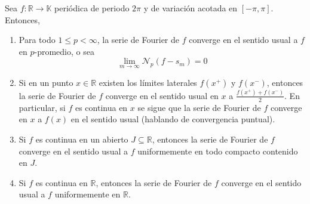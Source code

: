 \documentclass[12pt]{report}
\newcounter{it}
\theoremstyle{largebreak}
\renewcommand{\leq}{\ensuremath{\leqslant}}
\newcommand\cf[3]{\ensuremath{#1:#2\rightarrow#3}}
\newcommand{\N}[2]{\ensuremath{\mathcal{N}_{#1}\left(#2\right)}}
\begin{document}
    \begin{theor}
        Sea $\cf{f}{\mathbb{R}}{\mathbb{K}}$ periódica de periodo $2\pi$ y de variación acotada en $[-\pi,\pi]$. Entonces,
        \begin{enumerate}
            \item Para todo $1\leq p<\infty$, la serie de Fourier de $f$ converge en el sentido usual a $f$ en $p$-promedio, o sea
            \begin{equation*}
                \lim_{ m\rightarrow\infty}\N{p}{f-s_m}=0
            \end{equation*}
            \item Si en un punto $x\in\mathbb{R}$ existen los límites laterales $f(x^+)$ y $f(x^-)$, entonces la serie de Fourier de $f$ converge en el sentido usual en $x$ a $\frac{f(x^+)+f(x^-)}{2}$. En particular, si $f$ es continua en $x$ se sigue que la serie de Fourier de $f$ converge en $x$ a $f(x)$ en el sentido usual (hablando de convergencia puntual).
            \item Si $f$ es continua en un abierto $J\subseteq\mathbb{R}$, entonces la serie de Fourier de $f$ converge en el sentido usual a $f$ uniformemente en todo compacto contenido en $J$.
            \item Si $f$ es continua en $\mathbb{R}$, entonces la serie de Fourier de $f$ converge en el sentido usual a $f$ uniformemente en $\mathbb{R}$.
        \end{enumerate}
    \end{theor}
\end{document}
